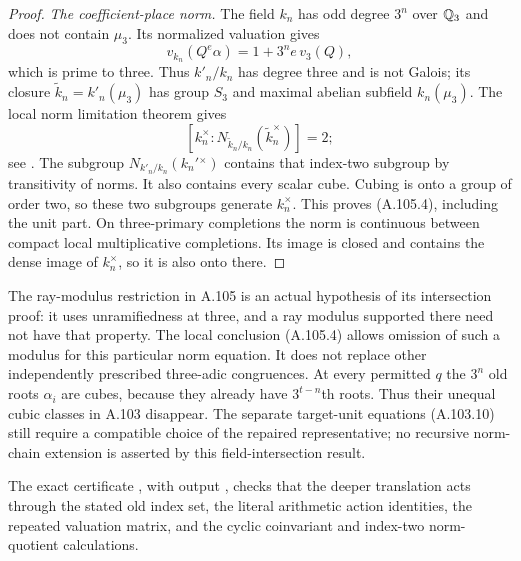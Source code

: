 \begin{proof}
\emph{The coefficient-place norm.}
The field $k_n$ has odd degree $3^n$ over $\mathbb Q_3$
and does not contain $\mu_3$.
Its normalized valuation gives
\[
             v_{k_n}(Q^e\alpha)=1+3^n e\,v_3(Q),
 \tag{A.105.11}
\]
which is prime to three.
Thus $k'_n/k_n$ has degree three and is not Galois;
its closure $\widetilde k_n=k'_n(\mu_3)$ has group
$S_3$ and maximal abelian subfield $k_n(\mu_3)$.
The local norm limitation theorem gives
\[
 [k_n^\times:N_{\widetilde k_n/k_n}
                  (\widetilde k_n^\times)]=2;
 \tag{A.105.12}
\]
see \cite[Remark 4.3.7, equation (4.3.1), and the Galois
case of Theorem 4.1.7]{BIR_KedlayaCFT}.
The subgroup $N_{k'_n/k_n}(k_n'{}^\times)$ contains
that index-two subgroup by transitivity of norms.
It also contains every scalar cube.
Cubing is onto a group of order two, so these two
subgroups generate $k_n^\times$.
This proves (A.105.4), including the unit part.
On three-primary completions the norm is continuous
between compact local multiplicative completions.
Its image is closed and contains the dense image
of $k_n^\times$, so it is also onto there.
\end{proof}

The ray-modulus restriction in A.105 is an actual
hypothesis of its intersection proof: it uses
unramifiedness at three, and a ray modulus supported
there need not have that property.
The local conclusion (A.105.4) allows omission of
such a modulus for this particular norm equation.
It does not replace other independently prescribed
three-adic congruences.
At every permitted $q$ the $3^n$ old roots $\alpha_i$
are cubes, because they already have $3^{t-n}$th roots.
Thus their unequal cubic classes in A.103 disappear.
The separate target-unit equations (A.103.10) still
require a compatible choice of the repaired
representative; no recursive norm-chain extension
is asserted by this field-intersection result.

\noindent The exact certificate
, with output
, checks
that the deeper translation acts through the stated
old index set, the literal arithmetic action identities,
the repeated valuation matrix, and the cyclic
coinvariant and index-two norm-quotient calculations.
